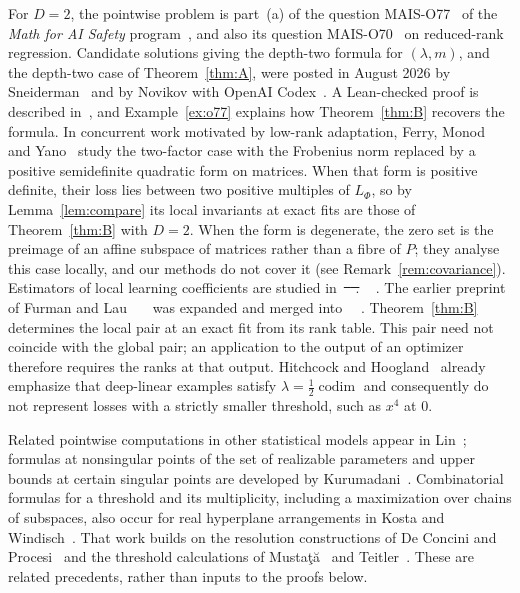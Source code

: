 \documentclass[11pt,a4paper]{article}
\makeatletter
\theoremstyle{definition}
\theoremstyle{remark}
\numberwithin{equation}{section}
\newcommand{\codim}{\operatorname{codim}}
\providecommand{\DIFaddtex}[1]{{\protect\color{blue}#1}} %
\providecommand{\DIFdeltex}[1]{{\protect\color{red}\sout{#1}}} %
\providecommand{\DIFaddbegin}{} %
\providecommand{\DIFaddend}{} %
\providecommand{\DIFdelbegin}{} %
\providecommand{\DIFdelend}{} %
\providecommand{\DIFadd}[1]{\texorpdfstring{\DIFaddtex{#1}}{#1}} %
\providecommand{\DIFdel}[1]{\texorpdfstring{\DIFdeltex{#1}}{}} %
\let\sout@orig\sout %
\renewcommand{\sout}[1]{\ifmmode\text{\sout@orig{\ensuremath{#1}}}\else\sout@orig{#1}\fi} %
\makeatother
\begin{document}
For $D=2$, the pointwise problem is part~(a) of the question MAIS-O77~\cite{mais-o77} of the \emph{Math for AI Safety} program~\cite{levine-mais,mais-repo}, and also its question MAIS-O70~\cite{mais-o70} on reduced-rank regression. Candidate solutions giving the depth-two formula for $(\lambda,m)$, and the depth-two case of Theorem~\ref{thm:A}, were posted in August 2026 by Sneiderman~\cite{mais-issue-3} and by Novikov with OpenAI Codex~\cite{mais-issue-12}. A Lean-checked proof is described in~\cite{feld-o77}, and Example~\ref{ex:o77} explains how Theorem~\ref{thm:B} recovers the formula. In concurrent work motivated by low-rank adaptation, Ferry, Monod and Yano~\cite{ferry-monod-yano} study the two-factor case with the Frobenius norm replaced by a positive semidefinite quadratic form on matrices. When that form is positive definite, their loss lies between two positive multiples of $L_\Phi$, so by Lemma~\ref{lem:compare} its local invariants at exact fits are those of Theorem~\ref{thm:B} with $D=2$. When the form is degenerate, the zero set is the preimage of an affine subspace of matrices rather than a fibre of $P$; they analyse this case locally, and our methods do not cover it (see Remark~\ref{rem:covariance}). Estimators of local learning coefficients are studied in~\DIFdelbegin \DIFdel{\mbox{%
\cite{furman-lau,lau-llc,hitchcock-hoogland}}\hskip0pt%
. }\DIFdelend \DIFaddbegin \DIFadd{\mbox{%
\cite{lau-llc,hitchcock-hoogland}}\hskip0pt%
. The earlier preprint of Furman and Lau~\mbox{%
\cite{furman-lau} }\hskip0pt%
was expanded and merged into~\mbox{%
\cite{lau-llc}}\hskip0pt%
. }\DIFaddend Theorem~\ref{thm:B} determines the local pair at an exact fit from its rank table. This pair need not coincide with the global pair; an application to the output of an optimizer therefore requires the ranks at that output. Hitchcock and Hoogland~\cite[Remark~B.6]{hitchcock-hoogland} already emphasize that deep-linear examples satisfy $\lambda=\tfrac12\codim$ and consequently do not represent losses with a strictly smaller threshold, such as $x^4$ at $0$.

Related pointwise computations in other statistical models appear in Lin~\cite[Section~5]{lin}; formulas at nonsingular points of the set of realizable parameters and upper bounds at certain singular points are developed by Kurumadani~\cite{kurumadani,kurumadani-upper}. Combinatorial formulas for a threshold and its multiplicity, including a maximization over chains of subspaces, also occur for real hyperplane arrangements in Kosta and Windisch~\cite[Theorem~4.2 and Corollary~4.4]{kosta-windisch}. That work builds on the resolution constructions of De Concini and Procesi~\cite{deconcini-procesi} and the threshold calculations of Mustaţă~\cite{mustata-arrangements} and Teitler~\cite{teitler}. These are related precedents, rather than inputs to the proofs below.
\end{document}
